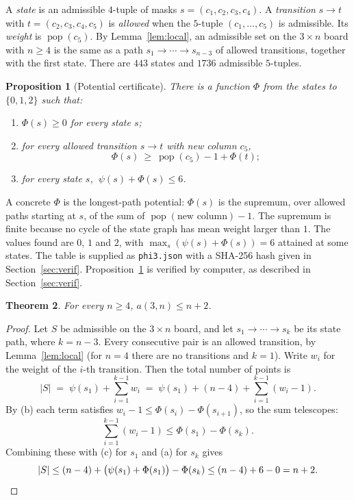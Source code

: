 \documentclass[11pt]{article}
\newtheorem{theorem}{Theorem}
\newtheorem{proposition}[theorem]{Proposition}
\theoremstyle{definition}
\theoremstyle{remark}
\begin{document}
A \emph{state} is an admissible $4$-tuple of masks $s=(c_1,c_2,c_3,c_4)$. A \emph{transition} $s\to t$ with $t=(c_2,c_3,c_4,c_5)$ is \emph{allowed} when the $5$-tuple $(c_1,\dots,c_5)$ is admissible. Its \emph{weight} is $\operatorname{pop}(c_5)$. By Lemma~\ref{lem:local}, an admissible set on the $3\times n$ board with $n\ge 4$ is the same as a path $s_1\to\cdots\to s_{n-3}$ of allowed transitions, together with the first state. There are $443$ states and $1736$ admissible $5$-tuples.

\begin{proposition}[Potential certificate]\label{prop:cert}
There is a function $\Phi$ from the states to $\{0,1,2\}$ such that:
\begin{enumerate}[label=(\alph*)]
\item $\Phi(s)\ge 0$ for every state $s$;
\item for every allowed transition $s\to t$ with new column $c_5$,
  \[\Phi(s)\ \ge\ \operatorname{pop}(c_5)-1+\Phi(t);\]
\item for every state $s$, $\ \psi(s)+\Phi(s)\le 6$.
\end{enumerate}
\end{proposition}

A concrete $\Phi$ is the longest-path potential: $\Phi(s)$ is the supremum, over allowed paths starting at $s$, of the sum of $\operatorname{pop}(\text{new column})-1$. The supremum is finite because no cycle of the state graph has mean weight larger than $1$. The values found are $0$, $1$ and $2$, with $\max_s(\psi(s)+\Phi(s))=6$ attained at some states. The table is supplied as \texttt{phi3.json} with a SHA-256 hash given in Section~\ref{sec:verif}. Proposition~\ref{prop:cert} is verified by computer, as described in Section~\ref{sec:verif}.

\begin{theorem}\label{thm:upper}
For every $n\ge 4$, $a(3,n)\le n+2$.
\end{theorem}

\begin{proof}
Let $S$ be admissible on the $3\times n$ board, and let $s_1\to\cdots\to s_k$ be its state path, where $k=n-3$. Every consecutive pair is an allowed transition, by Lemma~\ref{lem:local} (for $n=4$ there are no transitions and $k=1$). Write $w_i$ for the weight of the $i$-th transition. Then the total number of points is
\[
|S| \;=\; \psi(s_1)+\sum_{i=1}^{k-1} w_i \;=\; \psi(s_1)+(n-4)+\sum_{i=1}^{k-1}(w_i-1).
\]
By (b) each term satisfies $w_i-1\le \Phi(s_i)-\Phi(s_{i+1})$, so the sum telescopes:
\[
\sum_{i=1}^{k-1}(w_i-1)\le \Phi(s_1)-\Phi(s_k).
\]
Combining these with (c) for $s_1$ and (a) for $s_k$ gives
\[
|S|\le (n-4)+\bigl(\psi(s_1)+\Phi(s_1)\bigr)-\Phi(s_k)\le (n-4)+6-0=n+2.\qedhere
\]
\end{proof}
\end{document}
